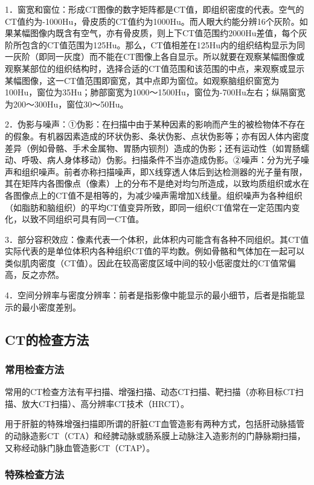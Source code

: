 1．窗宽和窗位：形成CT图像的数字矩阵都是CT值，即组织密度的代表。空气的CT值约为-1000Hu，骨皮质的CT值约为1000Hu。而人眼大约能分辨16个灰阶。如果某幅图像内既含有空气，亦有骨皮质，则上下CT值范围约2000Hu差值，每个灰阶所包含的CT值范围为125Hu。那么，CT值相差在125Hu内的组织结构显示为同一灰阶（即同一灰度）而不能在CT图像上各自显示。所以就要在观察某幅图像或观察某部位的组织结构时，选择合适的CT值范围和该范围的中点，来观察或显示某幅图像，这一CT值范围即窗宽，其中点即为窗位。如观察脑组织窗宽为100Hu，窗位为35Hu；肺部窗宽为1000～1500Hu，窗位为-700Hu左右；纵隔窗宽为200～300Hu，窗位30～50Hu。

2．伪影与噪声：①伪影：在扫描中由于某种因素的影响而产生的被检物体不存在的假象。有机器因素造成的环状伪影、条状伪影、点状伪影等；亦有因人体内密度差异（例如骨骼、手术金属物、胃肠内钡剂）造成的伪影；还有运动性（如胃肠蠕动、呼吸、病人身体移动）伪影。扫描条件不当亦造成伪影。②噪声：分为光子噪声和组织噪声。前者亦称扫描噪声，即X线穿透人体后到达检测器的光子量有限，其在矩阵内各图像点（像素）上的分布不是绝对均匀所造成，以致均质组织或水在各图像点上的CT值不是相等的，为减少噪声需增加X线量。组织噪声为各种组织（如脂肪和脑组织）的平均CT值变异所致，即同一组织CT值常在一定范围内变化，以致不同组织可具有同一CT值。

3．部分容积效应：像素代表一个体积，此体积内可能含有各种不同组织。其CT值实际代表的是单位体积内各种组织CT值的平均数。例如骨骼和气体加在一起可以类似肌肉密度（CT值）。因此在较高密度区域中间的较小低密度灶的CT值常偏高，反之亦然。

4．空间分辨率与密度分辨率：前者是指影像中能显示的最小细节，后者是指能显示的最小密度差别。

\subsection{CT的检查方法}

\subsubsection{常用检查方法}

常用的CT检查方法有平扫描、增强扫描、动态CT扫描、靶扫描（亦称目标CT扫描、放大CT扫描）、高分辨率CT技术（HRCT）。

用于肝脏的特殊增强扫描即所谓的肝脏CT血管造影有两种方式，包括肝动脉插管的动脉造影CT（CTA）和经脾动脉或肠系膜上动脉注入造影剂的门静脉期扫描，又称经动脉门脉血管造影CT（CTAP）。

\subsubsection{特殊检查方法}

